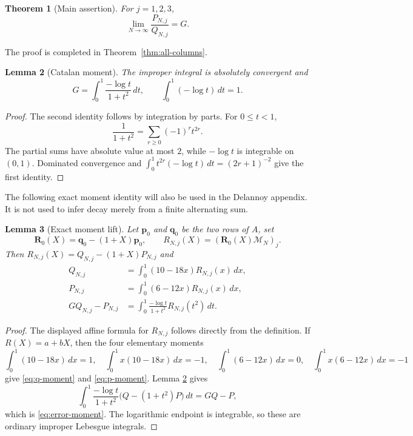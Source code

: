 \documentclass[11pt]{article}
\newtheorem{theorem}{Theorem}
\newtheorem{lemma}[theorem]{Lemma}
\theoremstyle{remark}
\begin{document}
\begin{theorem}[Main assertion]\label{thm:main-statement}
For $j=1,2,3$,
\[
       \lim_{N\to\infty}\frac{P_{N,j}}{Q_{N,j}}=G.
\]
\end{theorem}

The proof is completed in Theorem~\ref{thm:all-columns}.

\begin{lemma}[Catalan moment]\label{lem:catalan-moment}
The improper integral is absolutely convergent and
\[
 G=\int_0^1\frac{-\log t}{1+t^2}\,dt,
 \qquad \int_0^1(-\log t)\,dt=1.
\]
\end{lemma}

\begin{proof}
The second identity follows by integration by parts.  For $0\leq t<1$,
\[
 \frac1{1+t^2}=\sum_{r\geq0}(-1)^rt^{2r}.
\]
The partial sums have absolute value at most $2$, while
$-\log t$ is integrable on $(0,1)$.  Dominated convergence and
$\int_0^1t^{2r}(-\log t)\,dt=(2r+1)^{-2}$ give the first identity.
\end{proof}

The following exact moment identity will also be used in the
Delannoy appendix.  It is not used to infer decay merely from a
finite alternating sum.

\begin{lemma}[Exact moment lift]\label{lem:moment-lift}
Let $\mathbf p_0$ and $\mathbf q_0$ be the two rows of $A$, set
\[
 \mathbf R_0(X)=\mathbf q_0-(1+X)\mathbf p_0,
 \qquad R_{N,j}(X)=(\mathbf R_0(X)\mathcal M_N)_j.
\]
Then $R_{N,j}(X)=Q_{N,j}-(1+X)P_{N,j}$ and
\begin{align}
 Q_{N,j}&=\int_0^1(10-18x)R_{N,j}(x)\,dx,\label{eq:q-moment}\\
 P_{N,j}&=\int_0^1(6-12x)R_{N,j}(x)\,dx,\label{eq:p-moment}\\
 GQ_{N,j}-P_{N,j}
 &=\int_0^1\frac{-\log t}{1+t^2}R_{N,j}(t^2)\,dt.\label{eq:error-moment}
\end{align}
\end{lemma}

\begin{proof}
The displayed affine formula for $R_{N,j}$ follows directly from
the definition.  If $R(X)=a+bX$, then the four elementary moments
\[
 \int_0^1(10-18x)\,dx=1,\quad
 \int_0^1x(10-18x)\,dx=-1,\quad
 \int_0^1(6-12x)\,dx=0,\quad
 \int_0^1x(6-12x)\,dx=-1
\]
give \eqref{eq:q-moment} and \eqref{eq:p-moment}.  Lemma
\ref{lem:catalan-moment} gives
\[
 \int_0^1\frac{-\log t}{1+t^2}
       \bigl(Q-(1+t^2)P\bigr)\,dt=GQ-P,
\]
which is \eqref{eq:error-moment}.  The logarithmic endpoint is
integrable, so these are ordinary improper Lebesgue integrals.
\end{proof}
\end{document}
